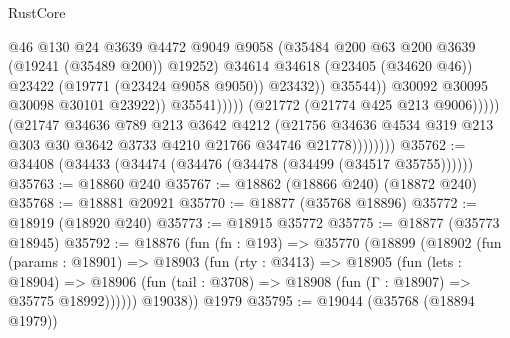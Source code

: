 \begin{lexlean}{RustCore}
\begin{coremodule}
                                            @46
                                            @130
                                            @24
                                            @3639
                                            @4472
                                            @9049
                                            @9058
                                            (@35484
                                              @200
                                              @63
                                              @200
                                              @3639
                                              (@19241 (@35489 @200))
                                              @19252)
                                            @34614
                                            @34618
                                            (@23405 (@34620 @46))
                                            @23422
                                            (@19771 (@23424 @9058 @9050))
                                            @23432))
                                        @35544))
                                    @30092
                                    @30095
                                    @30098
                                    @30101
                                    @23922))
                                @35541)))))
                      (@21772 (@21774 @425 @213 @9006)))))
                (@21747
                  @34636
                  @789
                  @213
                  @3642
                  @4212
                  (@21756
                    @34636
                    @4534
                    @319
                    @213
                    @303
                    @30
                    @3642
                    @3733
                    @4210
                    @21766
                    @34746
                    @21778))))))))
@35762 := @34408 (@34433 (@34474 (@34476 (@34478 (@34499 (@34517 @35755))))))
@35763 := @18860 @240
@35767 := @18862 (@18866 @240) (@18872 @240)
@35768 := @18881 @20921
@35770 := @18877 (@35768 @18896)
@35772 := @18919 (@18920 @240)
@35773 := @18915 @35772
@35775 := @18877 (@35773 @18945)
@35792 := @18876
    (fun (fn : @193) =>
    @35770
      (@18899
        (@18902
          (fun (params : @18901) =>
          @18903
            (fun (rty : @3413) =>
            @18905
              (fun (lets : @18904) =>
              @18906 (fun (tail : @3708) => @18908 (fun (Γ : @18907) => @35775 @18992))))))
        @19038))
    @1979
@35795 := @19044 (@35768 (@18894 @1979))

\end{coremodule}
\end{lexlean}
